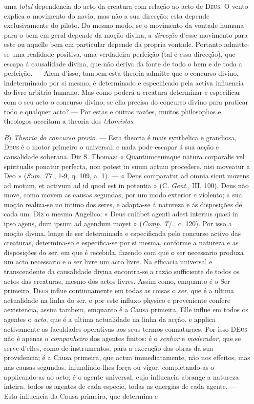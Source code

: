 uma \emph{total} dependencia do acto da creatura com relação ao acto de \textsc{Deus}. O vento explica o movimento do navio, mas não a sua direcção: esta depende exclusivamente do piloto. Do mesmo modo, se o movimento da vontade humana para o bem em geral depende da moção divina, a \emph{direcção} d'esse movimento para este ou aquelle bem em particular depende da propria vontade. Portanto admitte-se uma realidade positiva, uma verdadeira perfeição (tal é essa direcção), que escapa á causalidade divina, que não deriva da fonte de todo o bem e de toda a perfeição. --- Alem d'isso, tambem esta theoria admitte que o concurso divino, indeterminado por si mesmo, é determinado e especificado pela activa influencia do livre arbitrio humano. Mas como poderá a creatura determinar e especificar com o seu acto o concurso divino, se ella precisa do concurso divino para praticar todo e qualquer acto? --- Por estas e outras razões, muitos philosophos e theologos acceitam a theoria dos \emph{tAomistas}.\par \emph{B}) \emph{Theoria do concurso previo}. --- Esta theoria é mais synthelica e grandiosa, \textsc{Deus} é o motor primeiro o universal, e nada pode escapar á sua acção e causalidade soberana. Diz S. Thomaz: « Quantumceumque natura corporalis vel spiritualis ponatur perfecta, non potest in suum actum procedere, nisi moveatur a Deo » (\emph{Sum}. \emph{T}7., 1-9, q. 109, a. 1). --- « Deus comparatur ad omnia sicut movens ad motum, et activum ad id quod est in potentia » (C. \emph{Gent}., III, 100). Deus não move, como movem as causas segundas, por um modo exterior e violento; a sua moção realiza-se no intimo dos seres, e adapta-se á natureza e ás disposições de cada um. Diz o mesmo Angelico: « Deus cuilibet agenti adest interius quasi in ipso agens, dum ipsum ad agendum moyet » (\emph{Comp}. \emph{T}/., c. 120). Por isso a moção divina, longe de ser determinada e especificada pelo concurso activo das creaturas, determina-so e especifica-se por si mesma, conforme a natureza e as disposições do ser, em que é recebida, fazendo com que o ser necessario produza um acto necessario e o ser livre um acto livre. Na efficacia universal e transcendente da causalidade divina encontra-se a razão sufficiente de todos os actos das creaturas, mesmo dos actos livres. Assim como, emquanto é o Ser primeiro, \textsc{Deus} influe continuamente em todas as coisas o \emph{ser}, que é a ultima actualidade na linha do ser, e por este influxo physico e preveniente confere aexistencia, assim tambem, emquanto é a Causa primeira, Elle influe em todos os agentes o \emph{acto}, que é a ultima actualidade na linha da acção, e applica activamente as faculdades operativas aos seus termos connaturaes. Por isso \textsc{DEus} não é apenas o \emph{companheiro} dos agentes finitos; é o \emph{senhor} e \emph{moderador}, que se serve d'elles, como de instrumentos, para a execução das obras da sua providencia; é a Causa primeira, que actua immediatamente, não nos effeitos, mas nas causas segundas, infundindo-lhes força ou vigor, completando-as o applicando-as ao acto; é o agente universal, cuja influencia abrange a natureza inteira, todos os agentes de cada especie, todas as energias de cada agente. --- Esta influencia da Causa primeira, que determina e 
